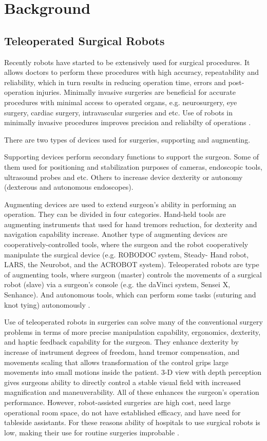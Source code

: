 \chapter{Background}
\label{back}

\section{Teleoperated Surgical Robots}
\label{sec:daVinci}
Recently robots have started to be extensively used for surgical procedures. It allows doctors to perform these procedures with high accuracy, repeatability and reliability, which in turn results in reducing operation time, errors and post-operation injuries. Minimally invasive surgeries are beneficial for accurate procedures with minimal access to operated organs, e.g. neurosurgery, eye surgery, cardiac surgery, intravascular surgeries and etc.  Use of robots in minimally invasive procedures improves precision and reliabilty of operations \cite{tavakoli_haptics_2008}.

There are two types of devices used for surgeries, supporting and augmenting. 

Supporting devices perform secondary functions to support the surgeon.  Some of them used for positioning and stabilization purposes of cameras, endoscopic tools, ultrasound probes and etc. Others to increase device dexterity or autonomy (dexterous and autonomous endoscopes).

Augmenting devices are used to extend surgeon's ability in performing an operation. They can be divided in four categories. Hand-held tools are augmenting instruments that used for hand tremors reduction, for dexterity and navigation capability increase. Another type of augmenting devices are cooperatively-controlled tools, where the surgeon and the robot cooperatively manipulate the surgical device (e.g. ROBODOC system, Steady- Hand robot, LARS, the Neurobot, and the ACROBOT system). Teleoperated robots are type of augmenting tools, where surgeon (master) controls the movements of a surgical robot (slave) via a surgeon's console (e.g. the daVinci system, Sensei X, Senhance). And autonomous tools, which can perform some tasks (suturing and knot tying) autonomously \cite{tavakoli_haptics_2008}.

Use of teleoperated robots in surgeries can solve many of the conventional surgery problems in terms of more precise manipulation capability, ergonomics, dexterity, and haptic feedback capability for the surgeon. They enhance dexterity by increase of instrument degrees of freedom, hand tremor compensation, and movements scaling that allows transformation of the control grips large movements into small motions inside the patient. 3-D view with depth perception gives surgeons ability to directly control a stable visual field with increased magnification and maneuverability. All of these enhances the surgeon's operation performance. However, robot-assisted surgeries are high cost, need large operational room space, do not have established efficacy, and have need for tableside assistants. For these reasons ability of hospitals to use surgical robots is low, making their use for routine surgeries improbable \cite{tavakoli_haptics_2008}.

